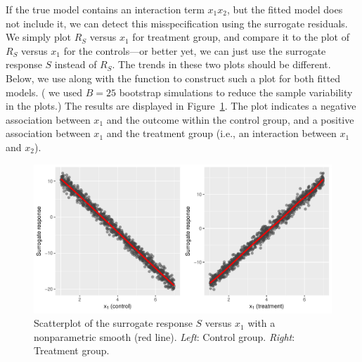 If the true model contains an interaction term $x_1 x_2$, but the fitted model does not include it, we can detect this misspecification using the surrogate residuals. We simply plot $R_S$ versus $x_1$ for treatment group, and compare it to the plot of $R_S$ versus $x_1$ for the controls---or better yet, we can just use the surrogate response $S$ instead of $R_S$. The trends in these two plots should be different. Below, we use  along with the  function to construct such a plot for both fitted models. ( we used $B = 25$ bootstrap simulations to reduce the sample variability in the plots.) The results are displayed in Figure~\ref{fig:interaction}. The plot indicates a negative association between $x_1$ and the outcome within the control group, and a positive association between $x_1$ and the treatment group (i.e., an interaction between $x_1$ and $x_2$).

\begin{figure}[!htbp]
  \centering
  \includegraphics[width=1\textwidth]{interaction}
  \caption{Scatterplot of the surrogate response $S$ versus $x_1$ with a nonparametric smooth (red line). \textit{Left}: Control group. \textit{Right}: Treatment group.}
  \label{fig:interaction}
\end{figure}


